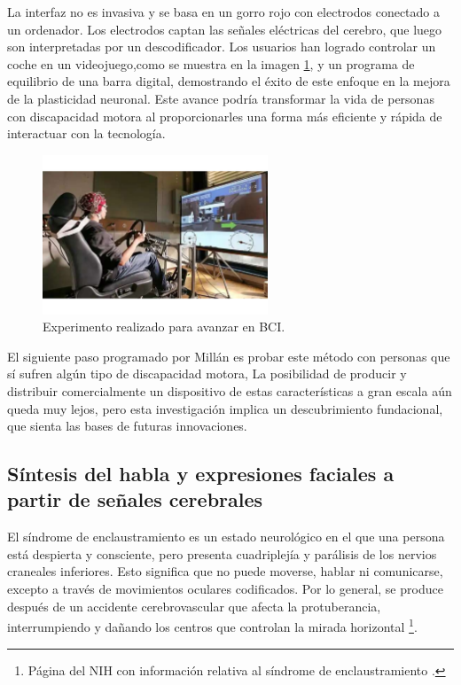 La interfaz no es invasiva y se basa en un gorro rojo con electrodos conectado a un ordenador. Los electrodos captan las señales eléctricas del cerebro, que luego son interpretadas por un descodificador. Los usuarios han logrado controlar un coche en un videojuego,como se muestra en la imagen \ref{fig: ExperimentoBCI}, y un programa de equilibrio de una barra digital, demostrando el éxito de este enfoque en la mejora de la plasticidad neuronal. Este avance podría transformar la vida de personas con discapacidad motora al proporcionarles una forma más eficiente y rápida de interactuar con la tecnología.

\begin{figure}[H]
    \centering
    \includegraphics[width=0.6\textwidth]{img/ExperimentoBCI.pdf}
    \caption{Experimento realizado para avanzar en BCI.}
    \label{fig: ExperimentoBCI}
\end{figure}

 El siguiente paso programado por Millán es probar este método con personas que sí sufren algún tipo de discapacidad motora, La posibilidad de producir y distribuir comercialmente un dispositivo de estas características a gran escala aún queda muy lejos, pero esta investigación implica un descubrimiento fundacional, que sienta las bases de futuras innovaciones.

 \subsection{Síntesis del habla y expresiones faciales a partir de señales cerebrales}

 El síndrome de enclaustramiento es un estado neurológico en el que una persona está despierta y consciente, pero presenta cuadriplejía y parálisis de los nervios craneales inferiores. Esto significa que no puede moverse, hablar ni comunicarse, excepto a través de movimientos oculares codificados. Por lo general, se produce después de un accidente cerebrovascular que afecta la protuberancia, interrumpiendo y dañando los centros que controlan la mirada horizontal \cite{SindromeEnclaustramiento}\footnote{Página del NIH con información relativa al síndrome de enclaustramiento \cite{SindromeEnclaustramiento}.}.
 
